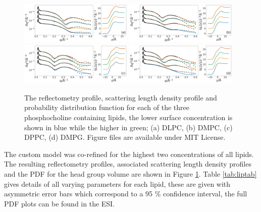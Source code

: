 \documentclass[twoside,twocolumn,9pt]{article}
\begin{document}
\begin{figure}
	\centering
	\includegraphics[width=0.48\textwidth]{figures/DLPC_all_data}
	\includegraphics[width=0.48\textwidth]{figures/DMPC_all_data}
	\includegraphics[width=0.48\textwidth]{figures/DPPC_all_data}
	\includegraphics[width=0.48\textwidth]{figures/DMPG_all_data}
	\caption{The reflectometry profile, scattering length density profile and probability distribution function for each of the three phosphocholine containing lipids, the lower surface concentration is shown in blue while the higher in green; (a) DLPC, (b) DMPC, (c) DPPC, (d) DMPG. Figure files are available under MIT License.\cite{mccluskey_2018}}
	\label{fig:lipids}
\end{figure}
The custom model was co-refined for the highest two concentrations of all lipids. The resulting reflectometry profiles, associated scattering length density profiles and the PDF for the head group volume are shown in Figure \ref{fig:lipids}. Table \ref{tab:liptab} gives details of all varying parameters for each lipid, these are given with asymmetric error bars which correspond to a 95 \% confidence interval, the full PDF plots can be found in the ESI. 
\end{document}

